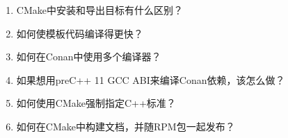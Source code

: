 \begin{enumerate}
\item
CMake中安装和导出目标有什么区别？

\item
如何使模板代码编译得更快？

\item
如何在Conan中使用多个编译器？

\item
如果想用preC++ 11 GCC ABI来编译Conan依赖，该怎么做？

\item
如何使用CMake强制指定C++标准？

\item
如何在CMake中构建文档，并随RPM包一起发布？
\end{enumerate}